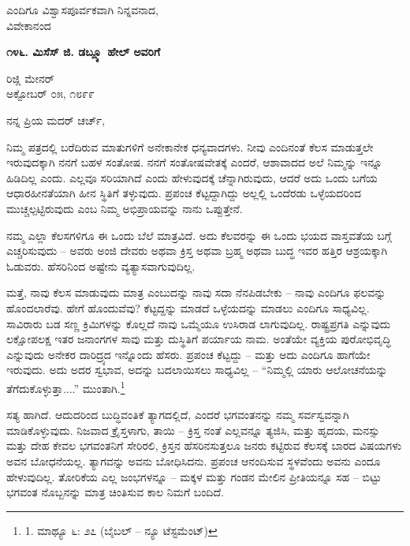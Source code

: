 \begin{flushright}
ಎಂದಿಗೂ ವಿಶ್ವಾಸಪೂರ್ವಕವಾಗಿ ನಿನ್ನವನಾದ,\\ವಿವೇಕಾನಂದ
\end{flushright}

\begin{center}
\textbf{೧೪೬. ಮಿಸೆಸ್ ಜಿ. ಡಬ್ಲ್ಯೂ ಹೇಲ್ ಅವರಿಗೆ}
\end{center}

\begin{flushright}
ರಿಜ್ಲಿ ಮೇನರ್\\ಅಕ್ಟೋಬರ್ ೦೫, ೧೮೯೯
\end{flushright}

ನನ್ನ ಪ್ರಿಯ ಮದರ್ ಚರ್ಚ್,

ನಿಮ್ಮ ಪತ್ರದಲ್ಲಿ ಬರೆದಿರುವ ಮಾತುಗಳಿಗೆ ಅನೇಕಾನೇಕ ಧನ್ಯವಾದಗಳು. ನೀವು ಎಂದಿನಂತೆ ಕೆಲಸ ಮಾಡುತ್ತಲೇ ಇರುವುದಕ್ಕಾಗಿ ನನಗೆ ಬಹಳ ಸಂತೋಷ. ನನಗೆ ಸಂತೋಷವೇತಕ್ಕೆ ಎಂದರೆ, ಆಶಾವಾದದ ಅಲೆ ನಿಮ್ಮನ್ನು ಇನ್ನೂ ಹಿಡಿದಿಲ್ಲ ಎಂದು. ಎಲ್ಲವೂ ಸರಿಯಾಗಿದೆ ಎಂದು ಹೇಳುವುದಕ್ಕೆ ಚೆನ್ನಾಗಿರುವುದು, ಆದರೆ ಅದು ಒಂದು ಬಗೆಯ ಆಧಾರಹೀನತೆಯಾಗಿ ಹೀನ ಸ್ಥಿತಿಗೆ ತಳ್ಳುವುದು. ಪ್ರಪಂಚ ಕೆಟ್ಟದ್ದಾಗಿದ್ದು ಅಲ್ಲಲ್ಲಿ ಒಂದೆರಡು ಒಳ್ಳೆಯದರಿಂದ ಮುಚ್ಚಲ್ಪಟ್ಟಿರುವುದು ಎಂಬ ನಿಮ್ಮ ಅಭಿಪ್ರಾಯವನ್ನು ನಾನು ಒಪ್ಪುತ್ತೇನೆ.

ನಮ್ಮ ಎಲ್ಲಾ ಕೆಲಸಗಳಿಗೂ ಈ ಒಂದು ಬೆಲೆ ಮಾತ್ರವಿದೆ. ಅದು ಕೆಲವರನ್ನು ಈ ಒಂದು ಭಯದ ವಾಸ್ತವತೆಯ ಬಗ್ಗೆ ಎಚ್ಚರಿಸುವುದು – ಅವರು ಅಂಜಿ ದೇವರು ಅಥವಾ ಕ್ರಿಸ್ತ ಅಥವಾ ಬ್ರಹ್ಮ ಅಥವಾ ಬುದ್ಧ ಇವರ ಹತ್ತಿರ ಆಶ್ರಯಕ್ಕಾಗಿ ಓಡುವರು. ಹೆಸರಿನಿಂದ ಅಷ್ಟೇನು ವ್ಯತ್ಯಾಸವಾಗುವುದಿಲ್ಲ.

ಮತ್ತೆ, ನಾವು ಕೆಲಸ ಮಾಡುವುದು ಮಾತ್ರ ಎಂಬುದನ್ನು ನಾವು ಸದಾ ನೆನಪಿಡಬೇಕು – ನಾವು ಎಂದಿಗೂ ಫಲವನ್ನು ಹೊಂದಲಾರೆವು. ಹೇಗೆ ಹೊಂದುವೆವು? ಕೆಟ್ಟದ್ದನ್ನು ಮಾಡದೆ ಒಳ್ಳೆಯದನ್ನು ಮಾಡಲು ಎಂದಿಗೂ ಸಾಧ್ಯ‌ವಿಲ್ಲ. ಸಾವಿರಾರು ಬಡ ಸಣ್ಣ ಕ್ರಿಮಿಗಳನ್ನು ಕೊಲ್ಲದೆ ನಾವು ಒಮ್ಮೆಯೂ ಉಸಿರಾಡ ಲಾಗುವುದಿಲ್ಲ. ರಾಷ್ಟ್ರಪ್ರಗತಿ ಎನ್ನುವುದು ಲಕ್ಷೋಪಲಕ್ಷ ಇತರ ಜನಾಂಗಗಳ ಸಾವು ಮತ್ತು ದುಸ್ಥಿತಿಗೆ ಪರ್ಯಾಯ ನಾಮ. ಅಂತೆಯೇ ವ್ಯಕ್ತಿಯ ಪುರೋಭಿವೃದ್ಧಿ ಎನ್ನುವುದು ಅನೇಕರ ದಾರಿದ್ರ್ಯದ ಇನ್ನೊಂದು ಹೆಸರು. ಪ್ರಪಂಚ ಕೆಟ್ಟದ್ದು – ಮತ್ತು ಅದು ಎಂದಿಗೂ ಹಾಗೆಯೇ ಇರುವುದು. ಅದು ಅದರ ಸ್ವಭಾವ, ಅದನ್ನು ಬದಲಾಯಿಸಲು ಸಾಧ್ಯವಿಲ್ಲ – “ನಿಮ್ಮಲ್ಲಿ ಯಾರು ಆಲೋಚನೆಯನ್ನು ತೆಗೆದುಕೊಳ್ಳುತ್ತಾ....” ಮುಂತಾಗಿ.\footnote{1. ಮಾಥ್ಯೂ ೬: ೨೭ (ಬೈಬಲ್ – ನ್ಯೂ ಟೆಸ್ಟಮೆಂಟ್)}

ಸತ್ಯ ಹಾಗಿದೆ. ಆದುದರಿಂದ ಬುದ್ಧಿವಂತಿಕೆ ತ್ಯಾಗದಲ್ಲಿದೆ, ಎಂದರೆ ಭಗವಂತನನ್ನು ನಮ್ಮ ಸರ್ವಸ್ವವನ್ನಾಗಿ ಮಾಡಿಕೊಳ್ಳುವುದು. ನಿಜವಾದ ಕ್ರೈಸ್ತಳಾಗು, ತಾಯಿ – ಕ್ರಿಸ್ತ ನಂತೆ ಎಲ್ಲವನ್ನೂ ತ್ಯಜಿಸಿ, ಮತ್ತು ಹೃದಯ, ಮನಸ್ಸು ಮತ್ತು ದೇಹ ಕೇವಲ ಭಗವಂತನಿಗೆ ಸೇರಿರಲಿ, ಕ್ರಿಸ್ತನ ಹೆಸರಿನಸುತ್ತಲೂ ಜನರು ಕಟ್ಟಿರುವ ಕೆಲಸಕ್ಕೆ ಬಾರದ ವಿಷಯಗಳು ಅವನ ಬೋಧನೆಯಲ್ಲ. ತ್ಯಾಗವನ್ನು ಅವನು ಬೋಧಿಸಿದನು. ಪ್ರಪಂಚ ಆನಂದಿಸುವ ಸ್ಥಳವೆಂದು ಅವನು ಎಂದೂ ಹೇಳುವುದಿಲ್ಲ. ತೋರಿಕೆಯ ಎಲ್ಲ ಜಂಭಗಳನ್ನೂ – ಮಕ್ಕಳ ಮತ್ತು ಗಂಡನ ಮೇಲಿನ ಪ್ರೀತಿಯನ್ನೂ ಸಹ – ಬಿಟ್ಟು ಭಗವಂತ ನೊಬ್ಬನನ್ನು ಮಾತ್ರ ಚಿಂತಿಸುವ ಕಾಲ ನಿಮಗೆ ಬಂದಿದೆ.

